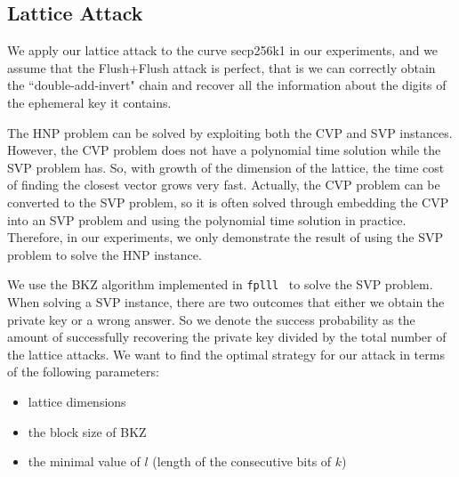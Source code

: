 %
%
%
%
%


\subsection{Lattice Attack}
\label{latticeattack}
We apply our lattice attack to the curve secp256k1 in our experiments, and we assume that the Flush+Flush attack is perfect, that is we can correctly obtain the ``double-add-invert" chain and recover all the information about the digits of the ephemeral key it contains.

The HNP problem can be solved by exploiting both the CVP and SVP instances.
However, the CVP problem does not have a polynomial time solution while the SVP problem has.
So, with growth of the dimension of the lattice, the time cost of finding the closest vector grows very fast.
 Actually, the CVP problem can be converted to the SVP problem,
  so it is often solved through embedding the CVP into an SVP problem and using the polynomial time solution in practice.
Therefore,
 in our experiments, we only demonstrate the result of using the SVP problem to solve the HNP instance.

 We use the BKZ algorithm implemented in \verb+fplll+~\cite{fplll} to solve the SVP problem.
When solving a SVP instance, there are two outcomes that either we obtain the private key or a wrong answer.
 So we denote the success probability as the amount of successfully recovering the private key divided by the total number of the lattice attacks.
We want to find the optimal strategy for our attack in terms of the following parameters:
\begin{itemize}
 \item  lattice dimensions
 \item  the block size of BKZ
 \item  the minimal value of $l$ (length of the consecutive bits of $k$)
\end{itemize}

